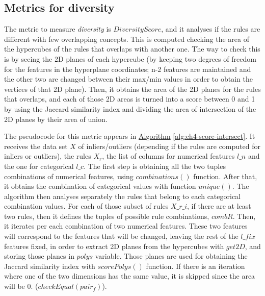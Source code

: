 \subsection{Metrics for diversity}\label{subsec:RuleExtractionDiversity}
The metric to measure \textit{diversity} is $DiversityScore$, and it analyses if the rules are different with few overlapping concepts. This is computed checking the area of the hypercubes of the rules that overlaps with another one.
The way to check this is by seeing the 2D planes of each hypercube (by keeping two degrees of freedom for the features in the hyperplane coordinates; n-2 features are maintained and the other two are changed between their max/min values in order to obtain the vertices of that 2D plane). Then, it obtains the area of the 2D planes for the rules that overlaps, and each of those 2D areas is turned into a score between 0 and 1 by using the Jaccard similarity index and dividing the area of intersection of the 2D planes by their area of union.

The pseudocode for this metric appears in \hyperref[alg:ch4-score-intersect]{Algorithm} \ref{alg:ch4-score-intersect}. It receives the data set $X$ of inliers/outliers (depending if the rules are computed for inliers or outliers), the rules $X_r$, the list of columns for numerical features $l\_n$ and the one for categorical $l\_c$.
The first step is obtaining all the two tuples combinations of numerical features, using $combinations()$ function. After that, it obtains the combination of categorical values with function $unique()$. The algorithm then analyses separately the rules that belong to each categorical combination values. For each of those subset of rules $X\_r\_i$, if there are at least two rules, then it defines the tuples of possible rule combinations, $combR$. Then, it iterates per each combination of two numerical features. These two features will correspond to the features that will be changed, leaving the rest of the $l\_fix$ features fixed, in order to extract 2D planes from the hypercubes with $get2D$, and storing those planes in $polys$ variable. Those planes are used for obtaining the Jaccard similarity index with $scorePolys()$ function. If there is an iteration where one of the two dimensions has the same value, it is skipped since the area will be 0. ($checkEqual(pair_f)$).

